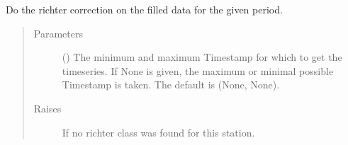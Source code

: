 \documentclass[letterpaper,10pt,english]{sphinxmanual}
\begin{document}
\begin{fulllineitems}
\begin{fulllineitems}
\begin{quote}
\begin{description}
\end{description}\end{quote}

\end{fulllineitems}


\begin{fulllineitems}
\label{\detokenize{weatherDB:weatherDB.station.PrecipitationStation.richter_correct}}
\sphinxAtStartPar
Do the richter correction on the filled data for the given period.
\begin{quote}\begin{description}
\item[{Parameters}] \leavevmode
\sphinxAtStartPar
{} ({\hyperref[\detokenize{weatherDB.lib:weatherDB.lib.utils.TimestampPeriod}]{}}\sphinxstyleliteralemphasis{\sphinxupquote{(}}\sphinxstyleliteralemphasis{\sphinxupquote{)}}\sphinxstyleliteralemphasis{\sphinxupquote{, }}) \textendash{} The minimum and maximum Timestamp for which to get the timeseries.
If None is given, the maximum or minimal possible Timestamp is taken.
The default is (None, None).

\item[{Raises}] \leavevmode
\sphinxAtStartPar
{} \textendash{} If no richter class was found for this station.

\end{description}\end{quote}

\end{fulllineitems}



\end{fulllineitems}
\end{document}

